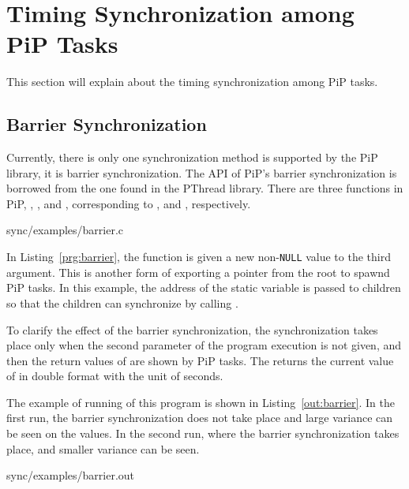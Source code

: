 
\section{Timing Synchronization among PiP Tasks}

This section will explain about the timing synchronization among PiP
tasks.

\subsection{Barrier Synchronization}

Currently, there is only one synchronization method is supported by
the PiP library, it is barrier synchronization. The API of PiP's
barrier synchronization is borrowed from the one found in the PThread
library. There are three functions in PiP,
, , and
  , corresponding to
  ,  and
  , respectively. 

 {sync/examples/barrier.c}

In Listing~\ref{prg:barrier}, the  function is
given a new non-{\tt NULL} value to the third argument. This is
another form of exporting a pointer from the root to spawnd PiP
tasks. In this example, the address of the 
static variable is passed to children so that the children can
synchronize by calling .

To clarify the effect of the barrier synchronization, the
synchronization takes place only when the second parameter of the
program execution is not given, and then the return values of
 are shown by PiP tasks. The
 returns the current value of
 in double format with the unit of seconds. 

The example of running of this program is shown in
Listing~\ref{out:barrier}. In the first run, the barrier
synchronization does not take place and large variance can be seen on
the  values. In the second run, where the
barrier synchronization takes place, and smaller variance can be seen.

 {sync/examples/barrier.out}


